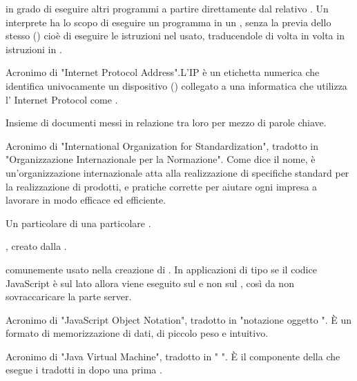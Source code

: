 { in grado di eseguire altri programmi a partire direttamente dal relativo . Un interprete ha lo scopo di eseguire un programma in un , senza la previa  dello stesso () cioè di eseguire le istruzioni nel  usato, traducendole di volta in volta in istruzioni in .}

{Acronimo di "Internet Protocol Address".L'IP è un etichetta numerica che identifica univocamente un dispositivo () collegato a una  informatica che utilizza l' Internet Protocol come .}


{Insieme di documenti messi in relazione tra loro per mezzo di parole chiave.} 


{Acronimo di "International Organization for Standardization", tradotto in "Organizzazione Internazionale per la Normazione". Come dice il nome, è un'organizzazione internazionale atta alla realizzazione di specifiche standard per la realizzazione di prodotti,  e pratiche corrette per aiutare ogni impresa a lavorare in modo efficace ed efficiente.}


{Un particolare  di una particolare .}





{ , creato dalla .}

{ comunemente usato nella creazione di . In applicazioni di tipo  se il codice JavaScript è sul lato  allora viene eseguito sul  e non sul , così da non sovraccaricare la parte server.}


{Acronimo di "JavaScript Object Notation", tradotto in "notazione oggetto ". \`{E} un formato di memorizzazione di dati, di piccolo peso e intuitivo.}


{Acronimo di "Java Virtual Machine", tradotto in " ". \`{E} il componente della  che esegue i  tradotti in  dopo una prima .}

